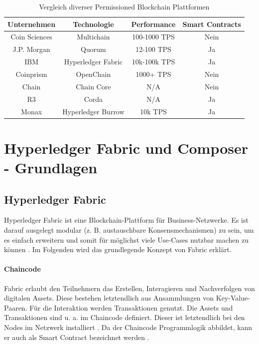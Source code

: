 \begin{table}[h]
    \centering
	\begin{tabular}{c c c c}
	\textbf{Unternehmen} & \textbf{Technologie}  & \textbf{Performance} & \textbf{Smart Contracts} \\ \hline
	Coin Sciences & Multichain & 100-1000 TPS & Nein \\ \hline
    J.P. Morgan & Quorum & 12-100 TPS & Ja \\ \hline
    IBM & Hyperledger Fabric & 10k-100k TPS & Ja \\ \hline
    Coinprism & OpenChain & 1000+ TPS & Nein \\ \hline
    Chain & Chain Core & N/A & Nein \\ \hline
    R3 & Corda & N/A & Ja \\ \hline
    Monax & Hyperledger Burrow & 10k TPS & Ja \\
    \end{tabular}
    \caption{Vergleich diverser Permissioned Blockchain Plattformen \cite{BenHamidaBlockchainEnterpriseOverview2017}\cite{HyperledgerBurrowTeamHyperledgerBurrowGitHub2018}}
	\label{tab:perm-comparison}
\end{table}


\section{Hyperledger Fabric und Composer - Grundlagen}
\label{sec:hyperledger-fabric-composer}

\subsection{Hyperledger Fabric}
Hyperledger Fabric ist eine Blockchain-Plattform für Business-Netzwerke. Es ist darauf ausgelegt modular (z. B. austauschbare Konsensmechanismen) zu sein, um es einfach erweitern und somit für möglichst viele Use-Cases nutzbar machen zu können \cite{HyperledgerFabricTeamHyperledgerWhitepaper2016}. Im Folgenden wird das grundlegende Konzept von Fabric erklärt.

\paragraph{Chaincode}
Fabric erlaubt den Teilnehmern das Erstellen, Interagieren und Nachverfolgen von digitalen Assets. Diese bestehen letztendlich aus Ansammlungen von Key-Value-Paaren. Für die Interaktion werden Transaktionen genutzt. Die Assets und Transaktionen sind u. a. im Chaincode definiert. Dieser ist letztendlich bei den Nodes im Netzwerk installiert \cite{SchererPerformanceScalabilityBlockchain2017}. Da der Chaincode Programmlogik abbildet, kann er auch als Smart Contract bezeichnet werden \cite{HyperledgerFabricTeamChaincodeHyperledgerFabric}.

